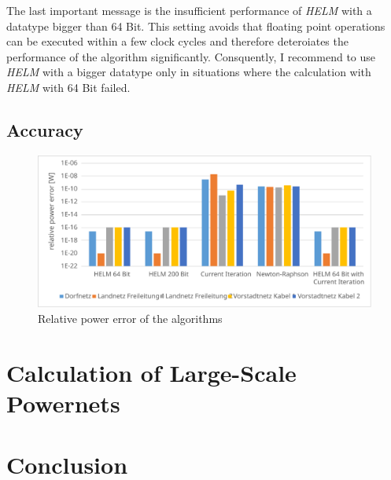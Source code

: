 The last important message is the insufficient performance of \emph{HELM} with a datatype bigger than 64 Bit. This setting avoids that floating point operations can be executed within a few clock cycles and therefore deteroiates the performance of the algorithm significantly. Consquently, I recommend to use \emph{HELM} with a bigger datatype only in situations where the calculation with \emph{HELM} with 64 Bit failed.

\subsection{Accuracy}

\begin{figure}
	\centering
	\includegraphics[scale=0.7]{figures/comparison_accuracy}
	\caption[Comparison, accuracy]{Relative power error of the algorithms}
	\label{fig:comparison_accuracy}
\end{figure}

\section{Calculation of Large-Scale Powernets}
\label{sec:large_scale_powernets}

\section{Conclusion}